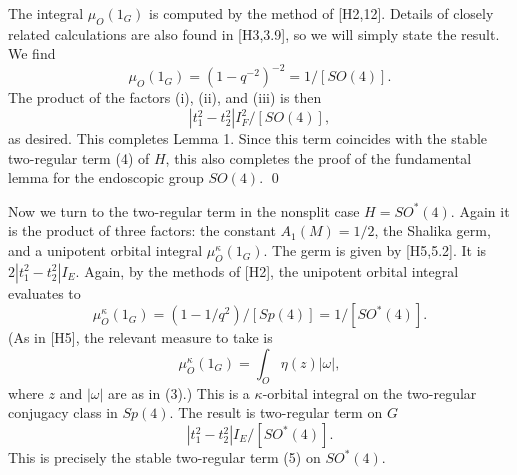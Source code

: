 \documentclass{amsart}
\begin{document}
The integral $\mu_O(1_G)$ is computed by the method of [H2,12].
Details of closely related calculations are 
also found in [H3,3.9], so
we will simply state the result.  We find
$$\mu_O(1_G) = (1-q^{-2})^{-2} = 1/[SO(4)].$$
The product of the factors (i), (ii), and (iii)
is then
$$|t_1^2 -t_2^2| I_F^2/[SO(4)],$$
as desired.  This completes Lemma 1.
Since this term coincides with the stable two-regular term (4)
of $H$, this also completes the proof of the fundamental
lemma for the endoscopic group $SO(4)$. \qed

Now we turn to the two-regular term 
in the nonsplit case $H = SO^*(4)$. Again it is the
product of three factors: the constant
$A_1(M) = 1/2$, the Shalika germ, and a unipotent
orbital integral $\mu^\kappa_O(1_G)$.
The germ is given by [H5,5.2]. It is
$2 |t_1^2 -t_2^2| I_E$.
Again, by the methods of [H2],
the unipotent orbital integral evaluates to
$$\mu_O^\kappa (1_G) = (1-1/q^2)/[Sp(4)] = 1/[SO^*(4)].$$
(As in [H5], the relevant measure to take is
$$\mu_O^\kappa (1_G) = \int_O \eta (z) |\omega|,$$
where $z$ and $|\omega|$ are as in (3).)
This  is a $\kappa$-orbital
integral on the two-regular conjugacy class in $Sp(4)$. 
The result is two-regular term on $G$
$$|t_1^2 - t_2^2| I_E/[SO^*(4)].$$
This is precisely the stable two-regular
term (5) on $SO^*(4)$.
\end{document}
